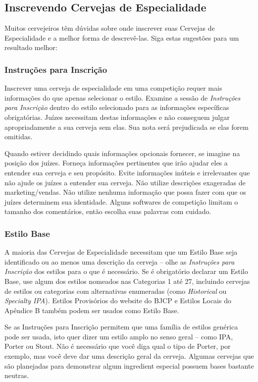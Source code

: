 \subsection*{Inscrevendo Cervejas de Especialidade}
Muitos cervejeiros têm dúvidas sobre onde inscrever suas Cervejas de Especialidade e a melhor forma de descrevê-las. Siga estas sugestões para um resultado melhor:
\subsubsection*{Instruções para Inscrição}
Inscrever uma cerveja de especialidade em uma competição requer mais informações do que apenas selecionar o estilo. Examine a sessão de \textit{Instruções para Inscrição} dentro do estilo selecionado para as informações específicas obrigatórias. Juízes necessitam destas informações e não conseguem julgar apropriadamente a sua cerveja sem elas. Sua nota será prejudicada se elas forem omitidas.

Quando estiver decidindo quais informações opcionais fornecer, se imagine na posição dos juízes. Forneça informações pertinentes que irão ajudar eles a entender sua cerveja e seu propósito. Evite informações inúteis e irrelevantes que não ajude os juízes a entender sua cerveja. Não utilize descrições exageradas de marketing/vendas. Não utilize nenhuma informação que possa fazer com que os juízes determinem sua identidade. Alguns softwares de competição limitam o tamanho dos comentários, então escolha suas palavras com cuidado.

\subsubsection*{Estilo Base}
A maioria das Cervejas de Especialidade necessitam que um Estilo Base seja identificado ou ao menos uma descrição da cerveja – olhe as \textit{Instruções para Inscrição} dos estilos para o que é necessário. Se é obrigatório declarar um Estilo Base, use algum dos estilos nomeados nas Categorias 1 até 27, incluindo cervejas de estilos ou categorias com alternativas enumeradas (como \textit{Historical} ou \textit{Specialty IPA}). Estilos Provisórios do website do BJCP e Estilos Locais do Apêndice B também podem ser usados como Estilo Base.

Se as Instruções para Inscrição permitem que uma família de estilos genérica pode ser usada, isto quer dizer um estilo amplo no senso geral – como IPA, Porter ou Stout. Não é necessário que você diga qual o tipo de Porter, por exemplo, mas você deve dar uma descrição geral da cerveja. Algumas cervejas que são planejadas para demonstrar algum ingredient especial possuem bases bastante neutras.

